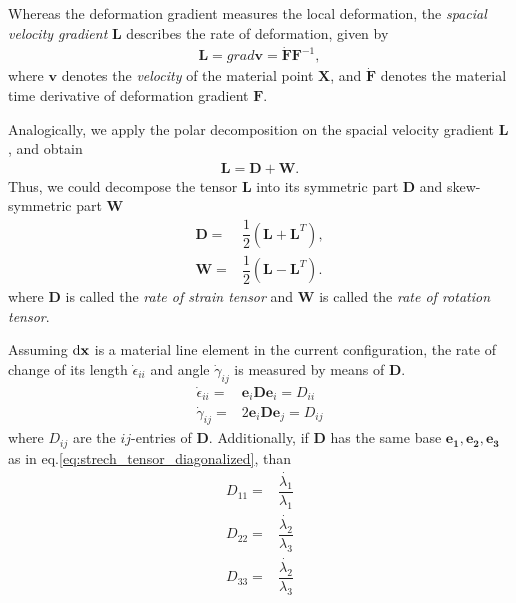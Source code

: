 \documentclass{beamer}
\begin{document}

\begin{frame}
Whereas the deformation gradient measures the local deformation, the \emph{spacial velocity gradient} $\mathbf{L}$ describes the rate of deformation, given by
\begin{align}
\mathbf{L} = grad \bm{v} = \dot{\mathbf{F}} \mathbf{F}^{-1},
\end{align}
where $\bm{v}$ denotes the \emph{velocity} of the material point $\mathbf{X}$, and $\dot{\mathbf{F}}$ denotes the material time derivative of deformation gradient $\mathbf{F}$. 

Analogically, we apply the polar decomposition on the spacial velocity gradient $\mathbf{L}$\cite{liu2002continuum}, and obtain
\begin{align}
\mathbf{L} = \mathbf{D}+\mathbf{W}.
\end{align}
Thus, we could decompose the tensor $\mathbf{L}$ into its symmetric part $\mathbf{D}$ and skew-symmetric part $\mathbf{W}$
\begin{align}
\mathbf{D}=&\dfrac{1}{2}(\mathbf{L}+\mathbf{L}^T), \\
\mathbf{W}=&\dfrac{1}{2}(\mathbf{L}-\mathbf{L}^T).
\end{align}
where $\mathbf{D}$ is called the \emph{rate of strain tensor} and $\mathbf{W}$ is called the \emph{rate of rotation tensor}.
\end{frame}


\begin{frame}
Assuming $\rm{d}\mathbf{x}$ is a material line element in the current configuration, the rate of change of its length $\dot{\epsilon}_{ii}$ and angle $\dot{\gamma}_{ij}$ is measured by means of $\mathbf{D}$\cite{haupt2013continuum}.
\begin{align}
\dot{\epsilon}_{ii}=&\mathbf{e}_i\mathbf{D}\mathbf{e}_i=D_{ii} \\
\dot{\gamma}_{ij}=&2\mathbf{e}_i\mathbf{D}\mathbf{e}_j=D_{ij}
\end{align}
where $D_{ij}$ are the $ij$-entries of $\mathbf{D}$. Additionally, if $\mathbf{D}$ has the same base ${\mathbf{e_1},\mathbf{e_2},\mathbf{e_3}}$ as in eq.\eqref{eq:strech_tensor_diagonalized}, than
\begin{align}
D_{11}=&\dfrac{\dot{\lambda_1}}{\lambda_1} \\
D_{22}=&\dfrac{\dot{\lambda_2}}{\lambda_3} \\
D_{33}=&\dfrac{\dot{\lambda_2}}{\lambda_3} 
\end{align}

\end{frame}
\end{document}

